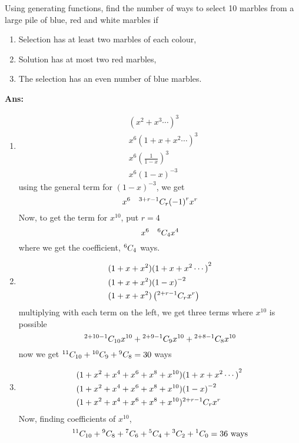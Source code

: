 \begin{example}
    Using generating functions, find the number of ways to select 10 marbles from a large pile of blue, red and white marbles if
    \begin{enumerate}
        \item Selection has at least two marbles of each colour,
        \item Solution has at most two red marbles,
        \item The selection has an even number of blue marbles.
    \end{enumerate}

    \textbf{Ans:} \begin{enumerate}
        \item \begin{align*}
                   & {(x^2+x^3\cdots)}^3                \\
                   & x^6 {(1+x+x^2\cdots)}^3            \\
                   & x^6 {\left(\frac{1}{1-x}\right)}^3 \\
                   & x^6 {(1-x)}^{-3}
              \end{align*}
              using the general term for \mbox{${(1-x)}^{-3}$}, we get
              \[
                  x^6\quad {}^{3+r-1}C_{r} {(-1)}^r x^r
              \]
              Now, to get the term for \mbox{$x^{10}$}, put \mbox{$r=4$}
              \[
                  x^6\quad{}^{6}C_{4} x^4
              \]
              where we get the coefficient, \mbox{${}^{6}C_{4}$} ways.

        \item \begin{align*}
                   & (1+x+x^2){(1+x+x^2\cdots)}^2             \\
                   & (1+x+x^2){(1-x)}^{-2}                    \\
                   & (1+x+x^2)\left({}^{2+r-1}C_{r}x^r\right)
              \end{align*}
              multiplying with each term on the left, we get three terms where \mbox{$x^{10}$} is possible
              \[
                  {}^{2+10-1}C_{10}x^{10} + {}^{2+9-1}C_{9}x^{10} + {}^{2+8-1}C_{8}x^{10}
              \]
              now we get \mbox{${}^{11}C_{10} + {}^{10}C_{9}+ {}^{9}C_{8} = 30$} ways

        \item \begin{align*}
                   & (1+x^2+x^4+x^6+x^8+x^{10}){(1+x+x^2\cdots)}^2\, \\
                   & (1+x^2+x^4+x^6+x^8+x^{10}){(1-x)}^{-2}         \\
                   & (1+x^2+x^4+x^6+x^8+x^{10}){}^{2+r-1}C_{r}x^r\, \\
              \end{align*}
              Now, finding coefficients of \mbox{$x^{10}$},
              \[
                  {}^{11}C_{10} + {}^{9}C_{8} + {}^{7}C_{6} +{}^{5}C_{4} + {}^{3}C_{2} + {}^{1}C_{0} = 36 \text{ ways}
              \]
    \end{enumerate}
\end{example}


